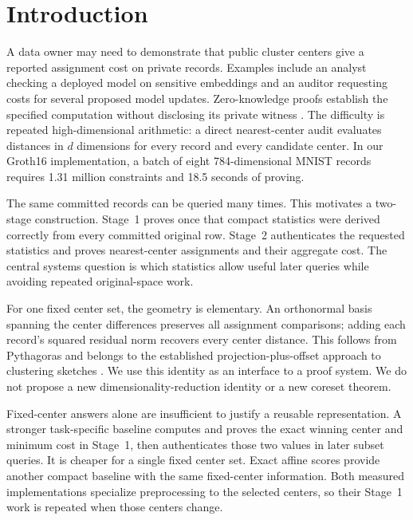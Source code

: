 \documentclass[5p,times,twocolumn]{elsarticle}
\theoremstyle{plain}
\theoremstyle{definition}
\theoremstyle{remark}
\begin{document}
\section{Introduction}\label{sec:introduction}
\begingroup\color{RevisionRed}
A data owner may need to demonstrate that public cluster centers give a reported assignment cost on private records. Examples include an analyst checking a deployed model on sensitive embeddings and an auditor requesting costs for several proposed model updates. Zero-knowledge proofs establish the specified computation without disclosing its private witness \cite{gmr1991knowledge,groth2016}. The difficulty is repeated high-dimensional arithmetic: a direct nearest-center audit evaluates distances in $d$ dimensions for every record and every candidate center. In our Groth16 implementation, a batch of eight 784-dimensional MNIST records requires 1.31 million constraints and 18.5 seconds of proving.


\par\endgroup
\begingroup\color{RevisionRed}
The same committed records can be queried many times. This motivates a two-stage construction. Stage~1 proves once that compact statistics were derived correctly from every committed original row. Stage~2 authenticates the requested statistics and proves nearest-center assignments and their aggregate cost. The central systems question is which statistics allow useful later queries while avoiding repeated original-space work.


\par\endgroup
\begingroup\color{RevisionRed}
For one fixed center set, the geometry is elementary. An orthonormal basis spanning the center differences preserves all assignment comparisons; adding each record's squared residual norm recovers every center distance. This follows from Pythagoras and belongs to the established projection-plus-offset approach to clustering sketches \cite{feldman2013tiny,feldman2020tiny,cohen2015dimensionality}. We use this identity as an interface to a proof system. We do not propose a new dimensionality-reduction identity or a new coreset theorem.


\par\endgroup
\begingroup\color{RevisionRed}
Fixed-center answers alone are insufficient to justify a reusable representation. A stronger task-specific baseline computes and proves the exact winning center and minimum cost in Stage~1, then authenticates those two values in later subset queries. It is cheaper for a single fixed center set. Exact affine scores provide another compact baseline with the same fixed-center information. Both measured implementations specialize preprocessing to the selected centers, so their Stage~1 work is repeated when those centers change.
\end{document}
